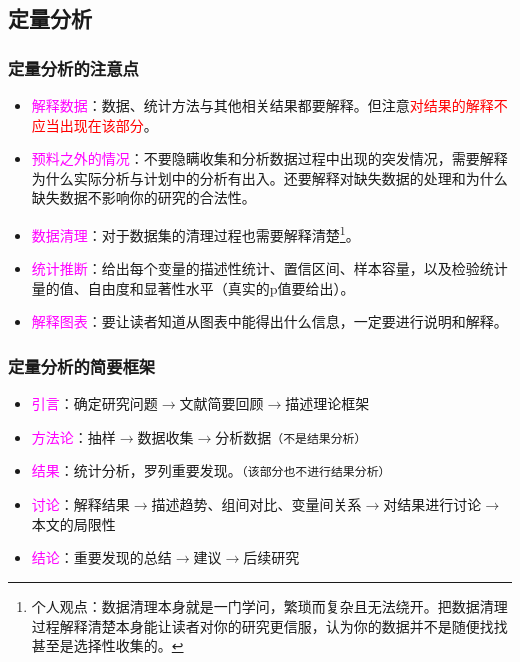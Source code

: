 \documentclass[cn,hazy,blue,14pt,screen]{elegantnote} %
\begin{document}
\subsection{定量分析}

\subsubsection{定量分析的注意点}

\begin{itemize}
  \item \textcolor{magenta}{解释数据}：数据、统计方法与其他相关结果都要解释。但注意\textcolor{red}{对结果的解释不应当出现在该部分}。
  \item \textcolor{magenta}{预料之外的情况}：不要隐瞒收集和分析数据过程中出现的突发情况，需要解释为什么实际分析与计划中的分析有出入。还要解释对缺失数据的处理和为什么缺失数据不影响你的研究的合法性。
  \item \textcolor{magenta}{数据清理}：对于数据集的清理过程也需要解释清楚\footnote{个人观点：数据清理本身就是一门学问，繁琐而复杂且无法绕开。把数据清理过程解释清楚本身能让读者对你的研究更信服，认为你的数据并不是随便找找甚至是选择性收集的。}。
  \item \textcolor{magenta}{统计推断}：给出每个变量的描述性统计、置信区间、样本容量，以及检验统计量的值、自由度和显著性水平（真实的p值要给出）。
  \item \textcolor{magenta}{解释图表}：要让读者知道从图表中能得出什么信息，一定要进行说明和解释。
\end{itemize}

\subsubsection{定量分析的简要框架}

\begin{itemize}
  \item \textcolor{magenta}{引言}：确定研究问题$\rightarrow$文献简要回顾$\rightarrow$描述理论框架
  \item \textcolor{magenta}{方法论}：抽样$\rightarrow$数据收集$\rightarrow$分析数据\lstinline{（不是结果分析）}
  \item \textcolor{magenta}{结果}：统计分析，罗列重要发现。\lstinline{（该部分也不进行结果分析）}
  \item \textcolor{magenta}{讨论}：解释结果$\rightarrow$描述趋势、组间对比、变量间关系$\rightarrow$对结果进行讨论$\rightarrow$本文的局限性
  \item \textcolor{magenta}{结论}：重要发现的总结$\rightarrow$建议$\rightarrow$后续研究
\end{itemize}
\end{document}
